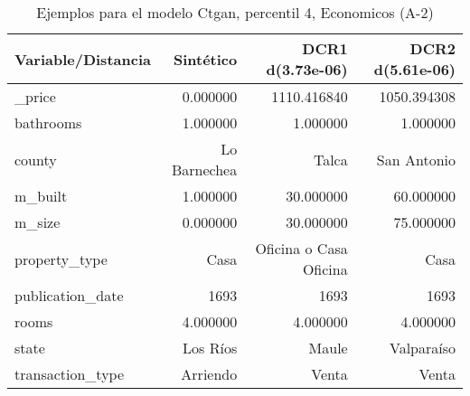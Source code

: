 \begin{table}[H]
\centering
\fontsize{10}{14}\selectfont
\caption{Ejemplos para el modelo Ctgan, percentil 4, Economicos (A-2)}
\label{table-example-economicos-a-2-ctgan-4p}
\begin{tabular}{|l|r|r|r|}
\hline
\rowcolor[gray]{0.8}
Variable/Distancia & Sintético & DCR1 d(3.73e-06) & DCR2 d(5.61e-06) \\
\hline \_price & \cellcolor[rgb]{0.9, 0.54, 0.52} 0.000000 & 1110.416840 & 1050.394308 \\
\hline bathrooms & \cellcolor[rgb]{0.9, 0.54, 0.52} 1.000000 & \cellcolor[rgb]{0.9, 0.54, 0.52} 1.000000 & \cellcolor[rgb]{0.9, 0.54, 0.52} 1.000000 \\
\hline county & \cellcolor[rgb]{0.9, 0.54, 0.52} Lo Barnechea & Talca & San Antonio \\
\hline m\_built & \cellcolor[rgb]{0.9, 0.54, 0.52} 1.000000 & 30.000000 & 60.000000 \\
\hline m\_size & \cellcolor[rgb]{0.9, 0.54, 0.52} 0.000000 & 30.000000 & 75.000000 \\
\hline property\_type & \cellcolor[rgb]{0.9, 0.54, 0.52} Casa & Oficina o Casa Oficina & \cellcolor[rgb]{0.9, 0.54, 0.52} Casa \\
\hline publication\_date & \cellcolor[rgb]{0.9, 0.54, 0.52} 1693 & \cellcolor[rgb]{0.9, 0.54, 0.52} 1693 & \cellcolor[rgb]{0.9, 0.54, 0.52} 1693 \\
\hline rooms & \cellcolor[rgb]{0.9, 0.54, 0.52} 4.000000 & \cellcolor[rgb]{0.9, 0.54, 0.52} 4.000000 & \cellcolor[rgb]{0.9, 0.54, 0.52} 4.000000 \\
\hline state & \cellcolor[rgb]{0.9, 0.54, 0.52} Los Ríos & Maule & Valparaíso \\
\hline transaction\_type & \cellcolor[rgb]{0.9, 0.54, 0.52} Arriendo & Venta & Venta \\
\hline
\end{tabular}
\end{table}
